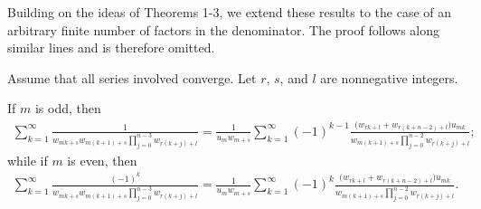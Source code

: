 \documentclass[12pt,reqno]{article}
\begin{document}
Building on the ideas of Theorems 1-3, we extend these results to the case of an arbitrary finite number of factors in the denominator. The proof follows along similar lines and is therefore omitted. 
\begin{theorem}\label{thm:n_factors}
	Assume that all series involved converge. Let $r$, $s$, and $l$ are nonnegative integers. 
	
	If $m$ is odd, then
		\begin{gather}\label{Th4_1}
		\sum_{k=1}^\infty 
		\frac{1}{w_{mk+s}w_{m(k+1)+s}\prod\limits_{j=0}^{n-3}w_{r(k+j)+l}}
		= \frac{1}{u_m w_{m+s}}\sum_{k=1}^\infty (-1)^{k-1}
		\frac{\big(w_{rk+l}+w_{r(k+n-2)+l}\big)u_{mk}}
		{w_{m(k+1)+s}\prod\limits_{j=0}^{n-2} w_{r(k+j)+l}};
		\end{gather}
	while if $m$ is even, then
	\begin{gather}\label{Th4_2}
		\sum_{k=1}^\infty 
		\frac{(-1)^k}{w_{mk+s}w_{m(k+1)+s}\prod\limits_{j=0}^{n-3}w_{r(k+j)+l}}
		= \frac{1}{u_m w_{m+s}}\sum_{k=1}^\infty (-1)^{k}
		\frac{\big(w_{rk+l}+w_{r(k+n-2)+l}\big)u_{mk}}
		{w_{m(k+1)+s}\prod\limits_{j=0}^{n-2} w_{r(k+j)+l}}.
		\end{gather}
\end{theorem}
\end{document}
